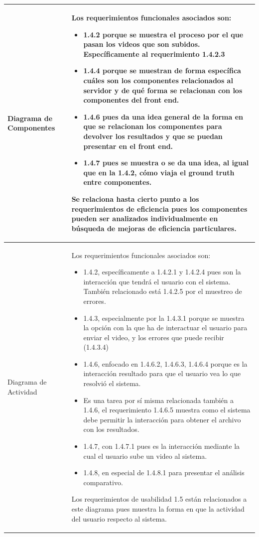 \documentclass[a4paper]{article}
\begin{document}
{\begin{table}[h!]
\begin{tabularx}{\textwidth}{|p{5cm}|p{9.1cm}|}
  \hline
  \end{tabularx}
\caption*{\color{Red} \color{Black}}
\end{table}

\newpage
\begin{table}[h!]
\begin{tabularx}{\textwidth}{|p{5cm}|p{9.1cm}|}
\hline
  Diagrama de Componentes&
  Los requerimientos funcionales asociados son:
  \begin{itemize}
  \item 1.4.2 porque se muestra el proceso por el que pasan los videos que son subidos. Específicamente al requerimiento 1.4.2.3
  \item 1.4.4 porque se muestran de forma específica cuáles son los componentes relacionados al servidor y de qué forma se relacionan con los componentes del front end. 
  \item 1.4.6 pues da una idea general de la forma en que se relacionan los componentes para devolver los resultados y que se puedan presentar en el front end. 
  \item 1.4.7 pues se muestra o se da una idea, al igual que en la 1.4.2, cómo viaja el ground truth entre componentes. 
  \end{itemize} 
  Se relaciona hasta cierto punto a los requerimientos de eficiencia pues los componentes pueden ser analizados individualmente en búsqueda de mejoras de eficiencia particulares. \\
  
  \hline 
  Diagrama de Actividad&
  Los requerimientos funcionales asociados son:
  \begin{itemize}
  \item 1.4.2, específicamente a 1.4.2.1 y 1.4.2.4 pues son la interacción que tendrá el usuario con el sistema. También relacionado está 1.4.2.5 por el muestreo de errores. 
  \item 1.4.3, especialmente por la 1.4.3.1 porque se muestra la opción con la que ha de interactuar el usuario para enviar el video, y los errores que puede recibir (1.4.3.4)
  \item 1.4.6, enfocado en 1.4.6.2, 1.4.6.3, 1.4.6.4 porque es la interacción resultado para que el usuario vea lo que resolvió el sistema. 
  \item Es una tarea por sí misma relacionada también a 1.4.6, el requerimiento 1.4.6.5 muestra como el sistema debe permitir la interacción para obtener el archivo con los resultados. 
  \item 1.4.7, con 1.4.7.1 pues es la interacción mediante la cual el usuario sube un video al sistema. 
  \item 1.4.8, en especial de 1.4.8.1 para presentar el análisis comparativo. 
  \end{itemize}
  Los requerimientos de usabilidad 1.5 están relacionados a este diagrama pues muestra la forma en que la actividad del usuario respecto al sistema. \\
    \hline
  

\end{tabularx}
\end{table}}
\end{document}
